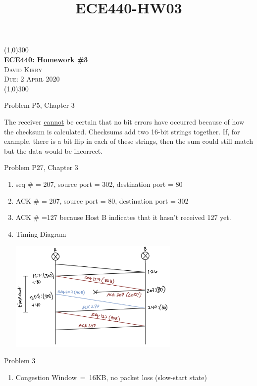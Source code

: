 \documentclass{article}
\title{ECE440-HW03}
\begin{document}
\begin{center}
    \line(1,0){300}\\[0.25cm]
 	\LARGE{\bfseries ECE440: Homework \#3}\\
 	\textsc{\LARGE David Kirby}\\
 	\textsc{\Large Due: 2 April 2020}\\
 	\line(1,0){300}\\[1.0cm]
\end{center}
\begin{enumerate}
\large{\bfseries \item Problem P5, Chapter 3}\par
The receiver \underline{cannot} be certain that no bit errors have occurred because of how the checksum is calculated. Checksums add two 16-bit strings together. If, for example, there is a bit flip in each of these strings, then the sum could still match but the data would be incorrect.\par
\large{\bfseries \item Problem P27, Chapter 3}\par
    \begin{enumerate}
      \item seq \# = 207, source port = 302, destination port = 80
      \item ACK \# = 207, source port = 80, destination port = 302
       \item ACK \# =127 because Host B indicates that it hasn't received 127 yet.
       \item Timing Diagram\par
        \centering
        \includegraphics[width=0.65\textwidth]{HW3_P2.jpeg}
    \end{enumerate}
\large{\bfseries \item Problem 3}\par
    \begin{enumerate}
        \item Congestion Window\ =\ 16KB, no packet loss (slow-start state)

\end{enumerate}
\end{enumerate}
\end{document}
